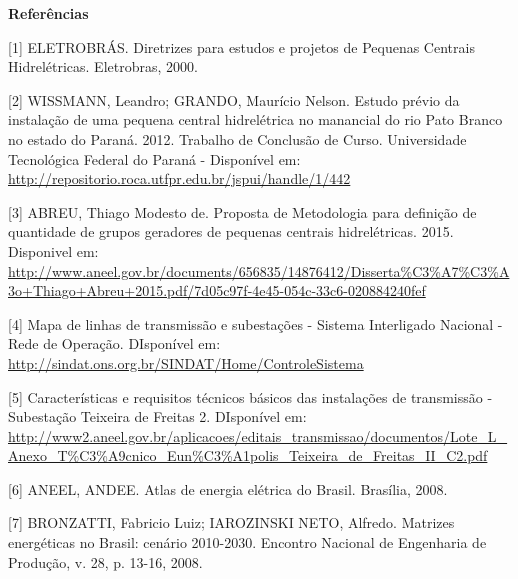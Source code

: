 \begin{center}
	\Large \textbf{Referências}
\end{center}
	
[1] ELETROBRÁS. Diretrizes para estudos e projetos de Pequenas Centrais Hidrelétricas. Eletrobras, 2000.

[2] WISSMANN, Leandro; GRANDO, Maurício Nelson. Estudo prévio da instalação de uma pequena central hidrelétrica no manancial do rio Pato Branco no estado do Paraná. 2012. Trabalho de Conclusão de Curso. Universidade Tecnológica Federal do Paraná - Disponível em: \url{http://repositorio.roca.utfpr.edu.br/jspui/handle/1/442}

[3] ABREU, Thiago Modesto de. Proposta de Metodologia para definição de quantidade de grupos geradores de pequenas centrais hidrelétricas. 2015. Disponivel em: \url{http://www.aneel.gov.br/documents/656835/14876412/Disserta%C3%A7%C3%A3o+Thiago+Abreu+2015.pdf/7d05c97f-4e45-054c-33c6-020884240fef}

[4] Mapa de linhas de transmissão e subestações - Sistema Interligado Nacional - Rede de Operação. DIsponível em:  \url{http://sindat.ons.org.br/SINDAT/Home/ControleSistema}

[5] Características e requisitos técnicos básicos das instalações de transmissão - Subestação Teixeira de Freitas 2. DIsponível em: \url{http://www2.aneel.gov.br/aplicacoes/editais_transmissao/documentos/Lote_L_Anexo_T%C3%A9cnico_Eun%C3%A1polis_Teixeira_de_Freitas_II_C2.pdf}
	
[6] ANEEL, ANDEE. Atlas de energia elétrica do Brasil. Brasília, 2008.

[7] BRONZATTI, Fabricio Luiz; IAROZINSKI NETO, Alfredo. Matrizes energéticas no Brasil: cenário 2010-2030. Encontro Nacional de Engenharia de Produção, v. 28, p. 13-16, 2008.

